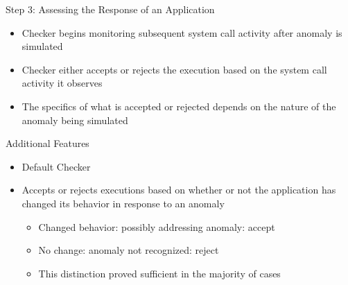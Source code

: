 \documentclass[pdf]{beamer}
\begin{document}
%
%


\begin{frame}{Step 3: Assessing the Response of an Application}
  \begin{itemize}
    \item{Checker begins monitoring subsequent system call activity
      after anomaly is simulated}
    \item{Checker either accepts or rejects the execution based on the system
      call activity it observes}
    \item{The specifics of what is accepted or rejected depends on the nature
      of the anomaly being simulated}
  \end{itemize}
\end{frame}


\begin{frame}{Additional Features}
  \begin{itemize}
    \item{Default Checker}
    \item{Accepts or rejects executions based on whether or not the
      application has changed its behavior in response to an anomaly}
      \begin{itemize}
        \item{Changed behavior: possibly addressing anomaly: accept}
        \item{No change: anomaly not recognized: reject}
        \item{This distinction proved sufficient in the majority of cases}
      \end{itemize}
  \end{itemize}
\end{frame}
\end{document}
